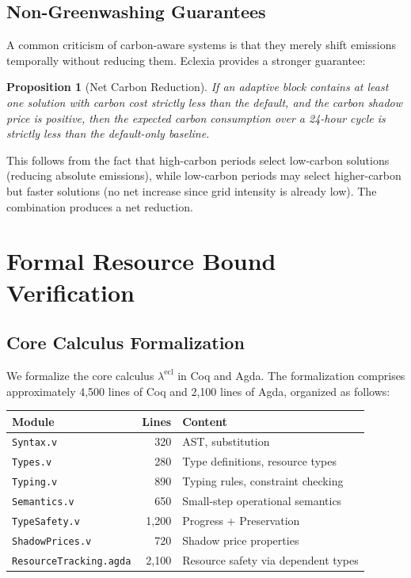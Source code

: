 \documentclass[11pt,a4paper]{article}
\newtheorem{proposition}[theorem]{Proposition}
\begin{document}
\subsection{Non-Greenwashing Guarantees}

A common criticism of carbon-aware systems is that they merely shift emissions
temporally without reducing them.  Eclexia provides a stronger guarantee:

\begin{proposition}[Net Carbon Reduction]
If an adaptive block contains at least one solution with carbon cost strictly
less than the default, and the carbon shadow price is positive, then the
expected carbon consumption over a 24-hour cycle is strictly less than the
default-only baseline.
\end{proposition}

This follows from the fact that high-carbon periods select low-carbon
solutions (reducing absolute emissions), while low-carbon periods may
select higher-carbon but faster solutions (no net increase since grid
intensity is already low).  The combination produces a net reduction.


\section{Formal Resource Bound Verification}
\label{sec:formal-verification}

\subsection{Core Calculus Formalization}

We formalize the core calculus $\lambda^{\mathrm{ecl}}$ in Coq and Agda.  The
formalization comprises approximately 4,500 lines of Coq and 2,100 lines of
Agda, organized as follows:

\begin{center}
\begin{tabular}{lrl}
\toprule
Module & Lines & Content \\
\midrule
\texttt{Syntax.v}        & 320  & AST, substitution \\
\texttt{Types.v}          & 280  & Type definitions, resource types \\
\texttt{Typing.v}         & 890  & Typing rules, constraint checking \\
\texttt{Semantics.v}      & 650  & Small-step operational semantics \\
\texttt{TypeSafety.v}     & 1,200 & Progress + Preservation \\
\texttt{ShadowPrices.v}   & 720  & Shadow price properties \\
\texttt{ResourceTracking.agda} & 2,100 & Resource safety via dependent types \\
\bottomrule
\end{tabular}
\end{center}
\end{document}
